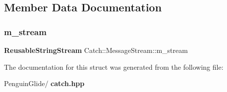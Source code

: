 \subsection{Member Data Documentation}
\mbox{\label{struct_catch_1_1_message_stream_a9202520faed8882ef469db9f353ec578}} 
\subsubsection{m\_stream}
{\footnotesize\ttfamily \textbf{ Reusable\+String\+Stream} Catch\+::\+Message\+Stream\+::m\+\_\+stream}



The documentation for this struct was generated from the following file\+:\begin{DoxyCompactItemize}
\item 
Penguin\+Glide/\textbf{ catch.\+hpp}\end{DoxyCompactItemize}
